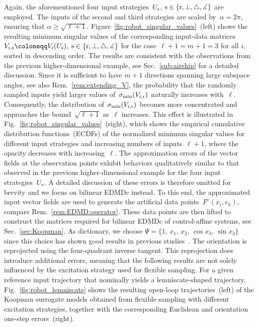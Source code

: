 \documentclass[a4paper, reqno]{amsart}
\newcommand{\dd}{\ell}
\begin{document}
Again, the aforementioned four input strategies~$U_\textnormal{s}$, $\textnormal{s}\in\{\textnormal{r},\perp,\triangle,\measuredangle\}$ are employed.
The inputs of the second and third strategies are scaled by~$\alpha=2\pi$, ensuring that $\alpha \geq \sqrt{\dd+1}$. 
Figure~\ref{fig:robot_singular_values}~(left) shows the resulting minimum singular values of the corresponding input-data matrices $V_{i,\textnormal{s}} \coloneqq V_i(U_\textnormal{s})$, $\textnormal{s}\in\{\textnormal{r},\perp, \triangle,\measuredangle\}$ for the case~$\dd+1=m+1=3$ for all $i$, sorted in descending order.
The results are consistent with the observations from the previous higher-dimensional example, see Sec.~\ref{sub:airship} for a detailed discussion.
%
Since it is sufficient to have $m+1$ directions spanning large subspace angles, see also Rem.~\ref{rem:extending_V}, the probability that the randomly sampled inputs yield larger values of~$\sigma_{\min}(V_{i, \textnormal{r}})$ naturally increases with~$\dd$.
Consequently, the distribution of~$\sigma_{\min}(V_{i,\textnormal{r}})$ becomes more concentrated and approaches the bound~$\sqrt{\dd+1}$ as~$\dd$ increases.
This effect is illustrated in Fig.~\ref{fig:robot_singular_values}~(right), which shows the empirical cumulative distribution functions~(ECDFs) of the normalized minimum singular values for different input strategies and increasing numbers of inputs~$\dd+1$, where the opacity decreases with increasing~$\dd$.
%
The approximation errors of the vector fields at the observation points exhibit behaviors qualitatively similar to that observed in the previous higher-dimensional example for the four input strategies~$U_{\textnormal{s}}$.
A detailed discussion of these errors is therefore omitted for brevity and we focus on bilinear EDMDc instead. 
To this end, the approximated input vector fields are used to generate the artificial data points~${F}^\varepsilon(x_i, e_k)$, compare Rem.~\ref{rem:EDMD:operator}.
These data points are then lifted to construct the matrices required for bilinear EDMDc of control-affine systems, see Sec.~\ref{sec:Koopman}.
As dictionary, we choose $\Psi=\{ 1,\,x_1,\,x_2,\,\cos x_3,\,\sin x_3 \}$ since this choice has shown good results in previous studies~\cite{bold2024robot, rose25Koopman}.
The orientation is reprojected using the four-quadrant inverse tangent. 
This reprojection does introduce additional errors, meaning that the following results are not solely influenced by the excitation strategy used for flexible sampling.
For a given reference input trajectory that nominally yields a lemniscate-shaped trajectory, Fig.~\ref{fig:robot_lemniscate} shows the resulting open-loop trajectories~(left) of the Koopman surrogate models obtained from flexible sampling with different excitation strategies, together with the corresponding Euclidean and orientation one-step errors~(right). 
\end{document}
